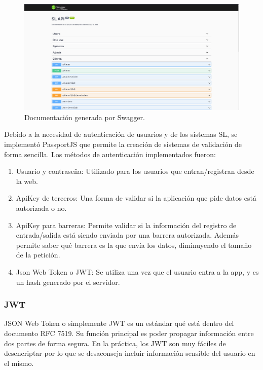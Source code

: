 \begin{figure}[bth]
    \centering
    \includegraphics[width=\textwidth]{imgs/server/swagger.png}
    \caption{Documentación generada por Swagger.}
    \label{fig:swagger-example}
\end{figure}

Debido a la necesidad de autenticación de usuarios y de los sistemas SL, se implementó PassportJS que permite la creación de sistemas de validación de forma sencilla. Los métodos de autenticación implementados fueron:

\begin{enumerate}
    \item Usuario y contraseña: Utilizado para los usuarios que entran/registran desde la web.
    \item ApiKey de terceros: Una forma de validar si la aplicación que pide datos está autorizada o no.
    \item ApiKey para barreras: Permite validar si la información del registro de entrada/salida está siendo enviada por una barrera autorizada. Además permite saber qué barrera es la que envía los datos, diminuyendo el tamaño de la petición.
    \item Json Web Token o JWT: Se utiliza una vez que el usuario entra a la app, y es un hash generado por el servidor.
\end{enumerate}

\subsubsection{JWT}

JSON Web Token o simplemente JWT es un estándar qué está dentro del documento RFC 7519. Su función principal es poder propagar información entre dos partes de forma segura. En la práctica, los JWT son muy fáciles de desencriptar por lo que se desaconseja incluir información sensible del usuario en el mismo.


